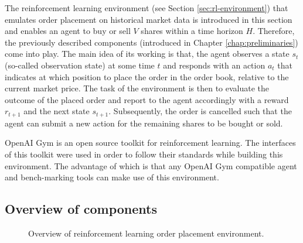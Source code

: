 The reinforcement learning environment (see Section \ref{sec:rl-environment}) that emulates order placement on historical market data is introduced in this section and enables an agent to buy or sell $V$ shares within a time horizon $H$.
Therefore, the previously described components (introduced in Chapter \ref{chap:preliminaries}) come into play.
The main idea of its working is that, the agent observes a state $s_t$ (so-called observation state) at some time $t$ and responds with an action $a_t$ that indicates at which position to place the order in the order book, relative to the current market price.
The task of the environment is then to evaluate the outcome of the placed order and report to the agent accordingly with a reward $r_{t+1}$ and the next state $s_{t+1}$.
Subsequently, the order is cancelled such that the agent can submit a new action for the remaining shares to be bought or sold.

OpenAI Gym \cite{brockman2016openai} is an open source toolkit for reinforcement learning.
The interfaces of this toolkit were used in order to follow their standards while building this environment.
The advantage of which is that any OpenAI Gym compatible agent and bench-marking tools can make use of this environment.

\subsection{Overview of components}

\begin{figure}[H]
    \centering
    \caption{Overview of reinforcement learning order placement environment.}
    \label{fig:rl-env-overview}
\end{figure}

